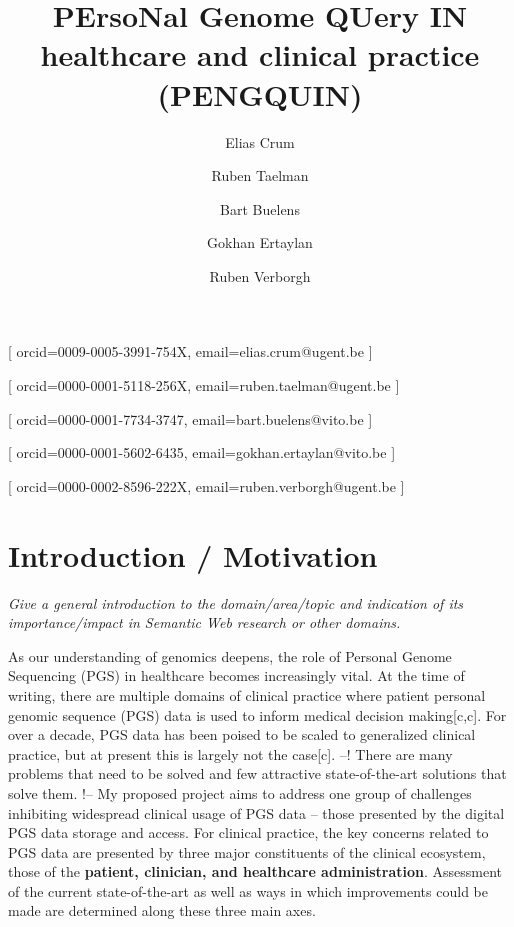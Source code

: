 \documentclass{article}
\begin{document}
\title{PErsoNal Genome QUery IN healthcare and clinical practice (PENGQUIN)}
\author[1,2]{Elias Crum}[
orcid=0009-0005-3991-754X,
email=elias.crum@ugent.be
]
\cormark[1]

\author[1]{Ruben Taelman}[
orcid=0000-0001-5118-256X,
email=ruben.taelman@ugent.be
]

\author[2]{Bart Buelens}[
orcid=0000-0001-7734-3747,
email=bart.buelens@vito.be
]

\author[2]{Gokhan Ertaylan}[
orcid=0000-0001-5602-6435,
email=gokhan.ertaylan@vito.be
]

\author[1]{Ruben Verborgh}[
orcid=0000-0002-8596-222X,
email=ruben.verborgh@ugent.be
]

\address [1] {IDLab, Department of Electronics and Information Systems, Ghent University -- imec, Belgium}
\address [2] {Flemish institute for Technological Research (VITO) Mol, Belgium}


\maketitle


\section{Introduction / Motivation}
\textit{Give a general introduction to the domain/area/topic and indication of its importance/impact in Semantic Web research or other domains.} 

As our understanding of genomics deepens, the role of Personal Genome Sequencing (PGS) in healthcare becomes increasingly vital. 
At the time of writing, there are multiple domains of clinical practice where patient personal genomic sequence (PGS) data is used to inform medical decision making[c,c]. 
For over a decade, PGS data has been poised to be scaled to generalized clinical practice, but at present this is largely not the case[c]. 
--! There are many problems that need to be solved and few attractive state-of-the-art solutions that solve them. !--
My proposed project aims to address one group of challenges inhibiting widespread clinical usage of PGS data -- those presented by the digital PGS data storage and access. 
For clinical practice, the key concerns related to PGS data are presented by three major constituents of the clinical ecosystem, those of the \textbf{patient, clinician, and healthcare administration}. 
Assessment of the current state-of-the-art as well as ways in which improvements could be made are determined along these three main axes.
\end{document}

